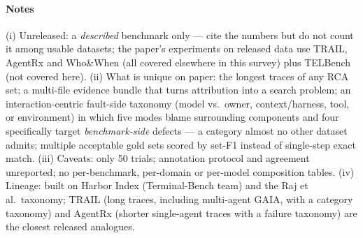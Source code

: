 \paragraph{Notes} (i) Unreleased: a \emph{described} benchmark only --- cite the numbers but do not count it among usable datasets; the paper's experiments on released data use TRAIL, AgentRx and Who\&When (all covered elsewhere in this survey) plus TELBench (not covered here). (ii) What is unique on paper: the longest traces of any RCA set; a multi-file evidence bundle that turns attribution into a search problem; an interaction-centric fault-side taxonomy (model vs.\ owner, context/harness, tool, or environment) in which five modes blame surrounding components and four specifically target \emph{benchmark-side} defects --- a category almost no other dataset admits; multiple acceptable gold sets scored by set-F1 instead of single-step exact match. (iii) Caveats: only 50 trials; annotation protocol and agreement unreported; no per-benchmark, per-domain or per-model composition tables. (iv) Lineage: built on Harbor Index (Terminal-Bench team) and the Raj et al.\ taxonomy; TRAIL (long traces, including multi-agent GAIA, with a category taxonomy) and AgentRx (shorter single-agent traces with a failure taxonomy) are the closest released analogues.
